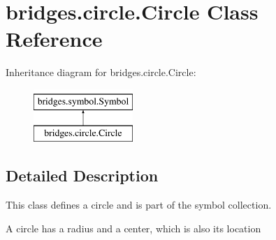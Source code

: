 \hypertarget{classbridges_1_1circle_1_1_circle}{}\section{bridges.\+circle.\+Circle Class Reference}
\label{classbridges_1_1circle_1_1_circle}
Inheritance diagram for bridges.\+circle.\+Circle\+:\begin{figure}[H]
\begin{center}
\leavevmode
\includegraphics[height=2.000000cm]{classbridges_1_1circle_1_1_circle}
\end{center}
\end{figure}


\subsection{Detailed Description}
This class defines a circle and is part of the symbol collection. 

A circle has a radius and a center, which is also its location

